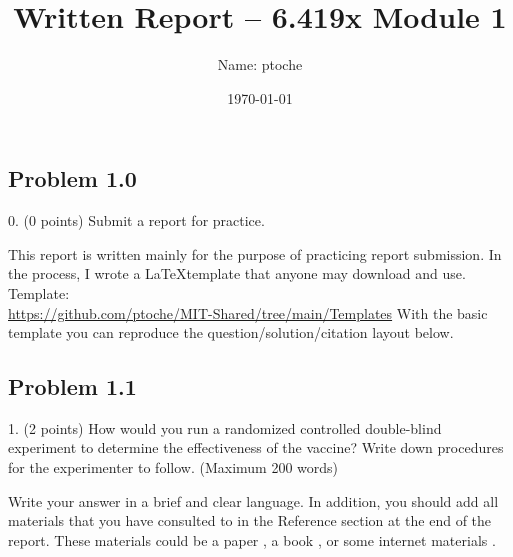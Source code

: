 \documentclass[11pt]{article}
\author{Name: ptoche}%
\title{Written Report – 6.419x Module 1}%
\date{\today}%
\begin{document}
\section*{\centering\thetitle}
\subsection*{\raggedleft\theauthor}

\subsection*{Problem 1.0}
\begin{question}
0. (0 points) 
Submit a report for practice. 
\end{question}

\begin{solution}
This report is written mainly for the purpose of practicing report submission. In the process, I wrote a \LaTeX template that anyone may download and use. 
Template:\\
\url{https://github.com/ptoche/MIT-Shared/tree/main/Templates}
With the basic template you can reproduce the question/solution/citation layout below. 
\end{solution}

\sepline

\subsection*{Problem 1.1}
\begin{question}
1. (2 points) 
How would you run a randomized controlled double-blind experiment to determine the effectiveness of the vaccine? Write down procedures for the experimenter to follow. 
(Maximum 200 words)
\end{question}

\begin{solution}
Write your answer in a brief and clear language. In addition, you should add all materials that you have consulted to in the Reference section at the end of the report.  These materials could be a paper \cite{Wasserstein:2016}, a book \cite{Gustavii:2017}, or some internet materials \cite{Wiki:PCA}.
\end{solution}


\sepline


\printbibliography%
\end{document}
